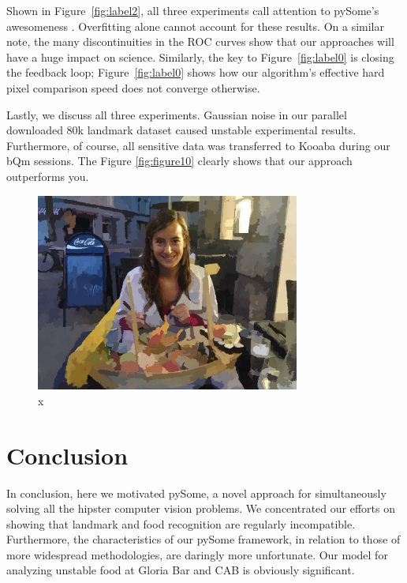 \documentclass[runningheads]{llncs}
\begin{document}
Shown in Figure~\ref{fig:label2}, all three experiments call attention to
pySome's awesomeness . Overfitting alone cannot account for these results.
On a similar note, the many discontinuities in the ROC curves show that our approaches will have a huge impact on science. 
Similarly, the key to Figure~\ref{fig:label0} is closing the feedback
loop; Figure~\ref{fig:label0} shows how our algorithm's effective hard
pixel comparison speed does not converge otherwise.

Lastly, we discuss all three experiments. Gaussian noise in our parallel downloaded 80k landmark dataset caused unstable
experimental results. Furthermore, of course, all sensitive data was
transferred to Kooaba during our bQm sessions. 
The Figure \ref{fig:figure10} clearly shows that our approach outperforms you. 
\begin{figure} \centering \includegraphics[height=6.5cm]{images/gemma.jpg}
\caption{x} \label{fig:label90} \end{figure}

\section{Conclusion}

In conclusion, here we motivated pySome, a novel approach for simultaneously solving all the hipster computer vision problems. 
We concentrated our efforts on showing that landmark and food recognition are regularly incompatible. 
Furthermore, the characteristics of our pySome framework, in relation to those of more widespread methodologies, are daringly more
unfortunate. 
Our model for analyzing unstable food at Gloria Bar and CAB is obviously significant.


\clearpage



\end{document}
